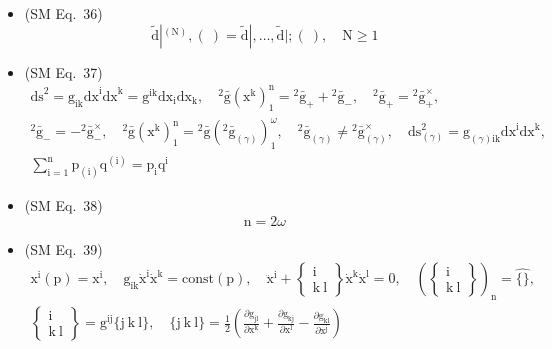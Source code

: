 \documentclass[
    12pt,              %
    a4paper,           %
    headings=normal,   %
    twoside=true,      %
    BCOR=8mm,          %
]{scrbook}
\begin{document}
\begin{itemize}[label={},leftmargin=0pt]
    \item (SM Eq.\ 36) 
    \[
    \tilde{\mathrm{d}}|^{(\mathrm{N})}, (\ ) = \tilde{\mathrm{d}}|, \dots, \tilde{\mathrm{d}}|; (\ ), \quad \mathrm{N} \ge 1
    \]

    \item (SM Eq.\ 37) 
    \[
    \begin{gathered} 
    \mathrm{ds}^2 = \mathrm{g}_{\mathrm{ik}} \mathrm{dx}^\mathrm{i} \mathrm{dx}^\mathrm{k} = \mathrm{g}^{\mathrm{ik}} \mathrm{dx}_\mathrm{i} \mathrm{dx}_\mathrm{k}, \quad {}^2\bar{\mathrm{g}}(\mathrm{x^k})_1^\mathrm{n} = {}^2\bar{\mathrm{g}}_+ + {}^2\bar{\mathrm{g}}_-, \quad {}^2\bar{\mathrm{g}}_+ = {}^2\bar{\mathrm{g}}_+^\times, \\ 
    {}^2\bar{\mathrm{g}}_- = -{}^2\bar{\mathrm{g}}_-^\times, \quad {}^2\bar{\mathrm{g}}(\mathrm{x^k})_1^\mathrm{n} = {}^2\bar{\mathrm{g}}({}^2\bar{\mathrm{g}}_{(\gamma)})_1^\omega, \quad {}^2\bar{\mathrm{g}}_{(\gamma)} \ne {}^2\bar{\mathrm{g}}_{(\gamma)}^\times, \quad \mathrm{ds}_{(\gamma)}^2 = \mathrm{g}_{(\gamma)\mathrm{ik}} \mathrm{dx}^\mathrm{i} \mathrm{dx}^\mathrm{k}, \\ 
    \sum_{\mathrm{i}=1}^\mathrm{n} \mathrm{p}_{(\mathrm{i})} \mathrm{q}^{(\mathrm{i})} = \mathrm{p_i} \mathrm{q^i} 
    \end{gathered}
    \]

    \item (SM Eq.\ 38) 
    \[
    \mathrm{n} = 2\omega
    \]

    \item (SM Eq.\ 39) 
    \[
    \begin{gathered}
    \mathrm{x^i}(\mathrm{p}) = \mathrm{x^i}, \quad \mathrm{g}_{\mathrm{ik}} \dot{\mathrm{x}}^\mathrm{i} \dot{\mathrm{x}}^\mathrm{k} = \mathrm{const}(\mathrm{p}), \quad \ddot{\mathrm{x}}^\mathrm{i} + \left\{ \begin{smallmatrix} \mathrm{i} \\ \mathrm{k\ l} \end{smallmatrix} \right\} \dot{\mathrm{x}}^\mathrm{k} \dot{\mathrm{x}}^\mathrm{l} = 0, \quad \left( \left\{ \begin{smallmatrix} \mathrm{i} \\ \mathrm{k\ l} \end{smallmatrix} \right\} \right)_\mathrm{n} = \widehat{\{\}}, \\
    \left\{ \begin{smallmatrix} \mathrm{i} \\ \mathrm{k\ l} \end{smallmatrix} \right\} = \mathrm{g}^{\mathrm{ij}} \{ \mathrm{j\ k\ l} \}, \quad \{ \mathrm{j\ k\ l} \} = \frac{1}{2}\left( \frac{\partial \mathrm{g}_{\mathrm{jl}}}{\partial \mathrm{x^k}} + \frac{\partial \mathrm{g}_{\mathrm{kj}}}{\partial \mathrm{x^l}} - \frac{\partial \mathrm{g}_{\mathrm{kl}}}{\partial \mathrm{x^j}} \right)
    \end{gathered}
    \]


\end{itemize}
\end{document}
